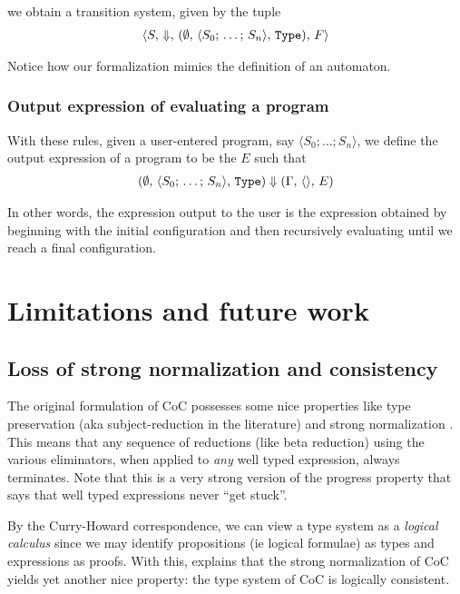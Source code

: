 \documentclass{article}
\begin{document}
we obtain a transition system, given by the tuple
\begin{align*}
  \langle S, \, \Downarrow, \, 
  (\emptyset, \, \langle S_0; \, \dots; \, S_n \rangle, \, \texttt{Type}), \, F \rangle
\end{align*}

Notice how our formalization mimics the definition of an automaton.

\subsubsection{Output expression of evaluating a program}
With these rules, given a user-entered program, say $\langle S_0;
\dots; S_n \rangle$, we define the
output expression of a program to be the $E$ such that
\begin{align*}
  (\emptyset, \, \langle S_0; \, \dots; \, S_n \rangle, \, \texttt{Type}) \Downarrow
  (\Gamma, \, \langle \rangle, \, E)
\end{align*}

In other words, the expression output to the user is the expression obtained by
beginning with the initial configuration and then recursively evaluating
until we reach a final configuration.

\section{Limitations and future work}
\subsection{Loss of strong normalization and consistency}
The original formulation of CoC possesses some nice properties like type
preservation (aka subject-reduction in the literature) and strong
normalization \cite{coc_strong_norm_kripke, coc_strong_norm_short_flexible}. 
This means that any sequence of reductions (like beta reduction) using the 
various eliminators, when applied to \textit{any} well typed expression, always terminates.
Note that this is a very strong version of the progress property that says
that well typed expressions never ``get stuck''. 

By the Curry-Howard correspondence, we can view a type system as a
\textit{logical calculus} since we may identify propositions (ie logical
formulae) as types and expressions as proofs.
With this, \cite{coc_strong_norm_kripke} explains that the strong normalization
of CoC yields yet another nice property: the type system of CoC is logically
consistent.
\end{document}
